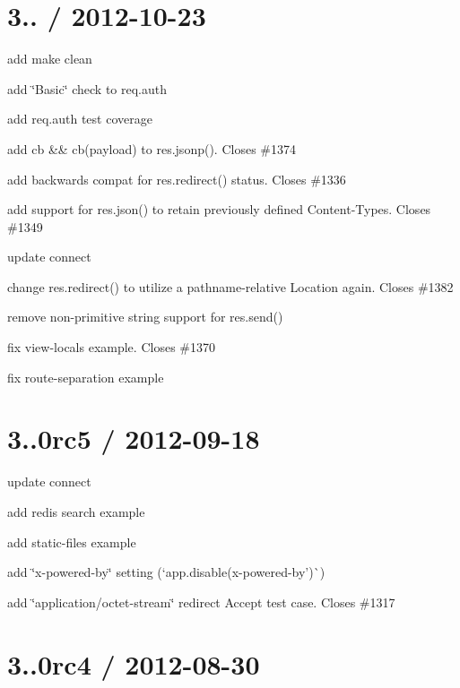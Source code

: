 {\ttfamily \section*{3.. / 2012-\/10-\/23 }}

{\ttfamily }

{\ttfamily 
\begin{DoxyItemize}
\item add {\ttfamily make clean}
\item add \char`\"{}\+Basic\char`\"{} check to req.\+auth
\item add {\ttfamily req.\+auth} test coverage
\item add cb \&\& cb(payload) to {\ttfamily res.\+jsonp()}. Closes \#1374
\item add backwards compat for {\ttfamily res.\+redirect()} status. Closes \#1336
\item add support for {\ttfamily res.\+json()} to retain previously defined Content-\/\+Types. Closes \#1349
\item update connect
\item change {\ttfamily res.\+redirect()} to utilize a pathname-\/relative Location again. Closes \#1382
\item remove non-\/primitive string support for {\ttfamily res.\+send()}
\item fix view-\/locals example. Closes \#1370
\item fix route-\/separation example
\end{DoxyItemize}}

{\ttfamily \section*{3..\+0rc5 / 2012-\/09-\/18 }}

{\ttfamily }

{\ttfamily 
\begin{DoxyItemize}
\item update connect
\item add redis search example
\item add static-\/files example
\item add \char`\"{}x-\/powered-\/by\char`\"{} setting (`app.\+disable(\textquotesingle{}x-\/powered-\/by')\`{})
\item add \char`\"{}application/octet-\/stream\char`\"{} redirect Accept test case. Closes \#1317
\end{DoxyItemize}}

{\ttfamily \section*{3..\+0rc4 / 2012-\/08-\/30 }}

